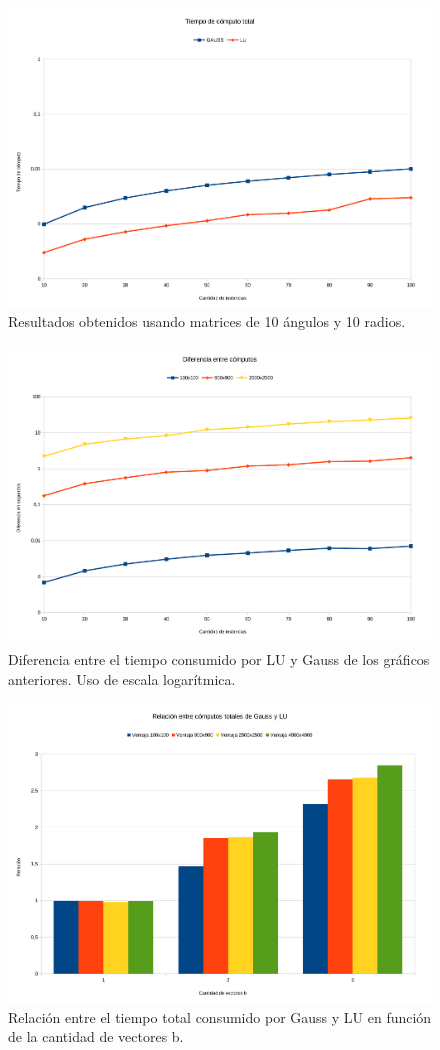 \begin{figure}[H]{}
\centering
\includegraphics[scale=0.5]{graphs/gaussVsLU3.pdf}
\caption{Resultados obtenidos usando matrices de 10 ángulos y 10 radios.}
\label{gaussVsLU3}
\end{figure}

\begin{figure}[H]{}
\centering
\includegraphics[scale=0.5]{graphs/dif.pdf}
\caption{Diferencia entre el tiempo consumido por LU y Gauss de los gráficos anteriores. Uso de escala logarítmica.}
\label{gaussVsLU4}
\end{figure}


\begin{figure}[H]{}
\centering
\includegraphics[scale=0.5]{graphs/ventRA.pdf}
\caption{Relación entre el tiempo total consumido por Gauss y LU en función de la cantidad de vectores b.}
\label{gaussVsLU5}
\end{figure}
